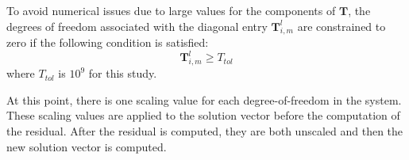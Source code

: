 To avoid numerical issues due to large values for the components of $\pmb{T}$, the degrees of freedom associated with the diagonal entry $\pmb{T}_{i,m}^{l}$ are constrained to zero if the following condition is satisfied:
%
\begin{equation}
	\pmb{T}_{i,m}^{l} \ge T_{tol}
\end{equation}
%
where $T_{tol}$ is $10^9$ for this study.

At this point, there is one scaling value for each degree-of-freedom in the system. These scaling values are applied to the solution vector before the computation of the residual. After the residual is computed, they are both unscaled and then the new solution vector is computed.